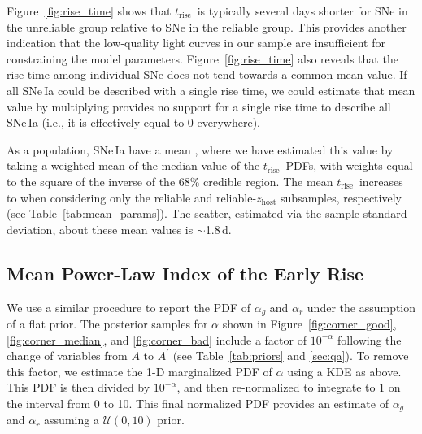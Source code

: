 \documentclass[twocolumn]{./aastex63}
\newcommand{\trise}{$t_\mathrm{rise}$}
\begin{document}
Figure~\ref{fig:rise_time} shows that \trise\ is typically several days
shorter for SNe in the unreliable group relative to SNe in the reliable group.
This provides another indication that the low-quality light curves in our
sample are insufficient for constraining the model parameters.
Figure~\ref{fig:rise_time} also reveals that the rise time among individual
SNe does not tend towards a common mean value. If all SNe\,Ia could be
described with a single rise time, we could estimate that mean value by
multiplying  provides no support for a single rise time to describe
all SNe\,Ia (i.e., it is effectively equal to 0 everywhere).

As a population, SNe\,Ia have a mean \edit1{\trise\,$\approx\,17.9$\,d}, where
we have estimated this value by taking a weighted mean of the median value of
the \trise\ PDFs, with weights equal to the square of the inverse of the 68\%
credible region. The mean \trise\ increases to  when considering only the reliable and reliable-$z_\mathrm{host}$
subsamples, respectively (see Table~\ref{tab:mean_params}). The scatter,
estimated via the sample standard deviation, about these mean values is
$\sim$1.8\,d.



\subsection{Mean Power-Law Index of the Early Rise}

We use a similar procedure to report the PDF of $\alpha_g$ and $\alpha_r$
under the assumption of a flat prior. The posterior samples for $\alpha$ shown
in Figure~\ref{fig:corner_good}, \ref{fig:corner_median}, and
\ref{fig:corner_bad} include a factor of $10^{-\alpha}$ following the
change of variables from $A$ to $A^\prime$ (see Table~\ref{tab:priors} and
\ref{sec:qa}). To remove this factor, we estimate the 1-D marginalized PDF of
$\alpha$ using a KDE as above. This PDF is then divided by $10^{-\alpha}$, and
then re-normalized to integrate to 1 on the interval from 0 to 10. This final
normalized PDF provides an estimate of $\alpha_g$ and $\alpha_r$ assuming a
$\mathcal{U}(0,10)$ prior.
\end{document}
